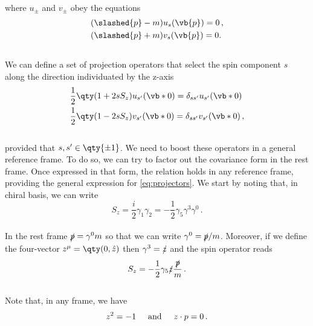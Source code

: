 \\
where $u_{\pm}$ and $v_{\pm}$ obey the equations
\\
\begin{equation}
    \begin{split}
        &(\slashed{p} - m) u_s(\vb{p}) = 0 \, ,\\
        &(\slashed{p} + m) v_s(\vb{p}) = 0.
    \end{split}
    \label{eq:Dirac_eqs}
\end{equation}
\\
We can define a set of projection operators that select the spin component $s$ along the direction individuated by the z-axis
\\
\begin{equation}
    \begin{split}
        &\frac{1}{2} \qty(1 + 2 s S_z) u_{s'}(\vb*{0}) = \delta_{ss'}u_{s'}(\vb*{0}) \\
        &\frac{1}{2} \qty(1 - 2 s S_z) v_{s'}(\vb*{0}) = \delta_{ss'}v_{s'}(\vb*{0}) \,,
    \end{split}
    \label{eq:projectors}
\end{equation}
\\
provided that $s,s' \in \qty{\pm 1}$. We need to boost these operators in a general reference frame. To do so, we can try to factor out the covariance form in the rest frame. Once expressed in that form, the relation holds in any reference frame, providing the general expression for \eqref{eq:projectors}. We start by noting that, in chiral basis, we can write
\\
\begin{equation}
    S_z = \frac{i}{2}\gamma_1 \gamma_2 = -\frac{1}{2}\gamma_5 \gamma^3 \gamma^0 \,.
\end{equation}
\\
In the rest frame $\slashed{p} = \gamma^0 m$ so that we can write $\gamma^0 = \slashed{p}/m$. Moreover, if we define the four-vector $ z^{\mu} = \qty(0, \hat{z})$ then $\gamma^3 = \slashed{z}$ and the spin operator reads
\\
\begin{equation}
    S_z = -\frac{1}{2} \gamma_5 \slashed{z} \frac{\slashed{p}}{m} \,.
\end{equation}  
\\
Note that, in any frame, we have
\\
\begin{equation}
    z^2 = -1 \hspace{5mm} \textrm{and} \hspace{5mm} z \cdot p = 0 \,.
\end{equation}
